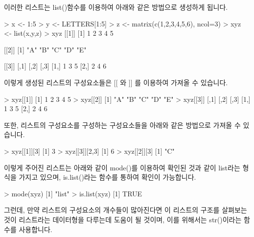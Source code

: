 이러한 리스트는 list()함수를 이용하여 아래와 같은 방법으로 생성하게 됩니다.

\begin{Schunk}
\begin{Soutput}
> x <- 1:5
> y <- LETTERS[1:5]
> z <- matrix(c(1,2,3,4,5,6), ncol=3)
> xyz <- list(x,y,z)
> xyz
[[1]]
[1] 1 2 3 4 5

[[2]]
[1] "A" "B" "C" "D" "E"

[[3]]
     [,1] [,2] [,3]
[1,]    1    3    5
[2,]    2    4    6
 
\end{Soutput}
\end{Schunk}

이렇게 생성된 리스트의 구성요소들은 $[[$ 와 $]]$ 를 이용하여 가져올 수 있습니다.

\begin{Schunk}
\begin{Soutput}
> xyz[[1]]
[1] 1 2 3 4 5
> xyz[[2]]
[1] "A" "B" "C" "D" "E"
> xyz[[3]]
     [,1] [,2] [,3]
[1,]    1    3    5
[2,]    2    4    6

\end{Soutput}
\end{Schunk}

또한, 리스트의 구성요소를 구성하는 구성요소들을 아래와 같은 방법으로 가져올 수 있습니다.
\begin{Schunk}
\begin{Soutput}
> xyz[[1]][3]
[1] 3
> xyz[[3]][2,3]
[1] 6
> xyz[[2]][3]
[1] "C"

\end{Soutput}
\end{Schunk}

이렇게 주어진 리스트는 아래와 같이 mode()를 이용하여 확인된 것과 같이 list라는 형식을 가지고 있으며, is.list()라는 함수를 통하여 확인이 가능합니다.

\begin{Schunk}
\begin{Soutput}
> mode(xyz)
[1] "list"
> is.list(xyz)
[1] TRUE
\end{Soutput}
\end{Schunk}

그런데, 만약 리스트의 구성요소의 개수들이 많아진다면 이 리스트의 구조를 살펴보는 것이 리스트라는 데이터형을 다루는데 도움이 될 것이며, 이를 위해서는 str()이라는 함수를 사용합니다.

\begin{Schunk}
\end{Schunk}

